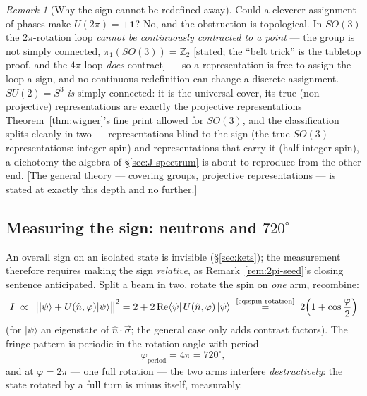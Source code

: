\documentclass[11pt]{article}
\theoremstyle{plain}
\theoremstyle{definition}
\theoremstyle{remark}
\newtheorem{remark}[theorem]{Remark}
\newcommand{\idop}{\mathbf{1}}  %
\newcommand{\ket}[1]{\lvert #1 \rangle}
\newcommand{\bra}[1]{\langle #1 \rvert}
\begin{document}
\begin{remark}[Why the sign cannot be redefined away]
\label{rem:topology}
Could a cleverer assignment of phases make $U(2\pi) = +\idop$? No,
and the obstruction is topological. In $SO(3)$ the $2\pi$-rotation
loop \emph{cannot be continuously contracted to a point} --- the
group is not simply connected, $\pi_1(SO(3)) = \mathbb Z_2$
[stated; the ``belt trick'' is the tabletop proof, and the
$4\pi$ loop \emph{does} contract] --- so a representation is free
to assign the loop a sign, and no continuous redefinition can
change a discrete assignment. $SU(2) = S^3$ \emph{is} simply
connected: it is the universal cover, its true (non-projective)
representations
are exactly the projective representations
Theorem~\ref{thm:wigner}'s fine print allowed for $SO(3)$, and the
classification splits cleanly in two --- representations blind to
the sign (the true $SO(3)$ representations: integer spin) and
representations that carry it (half-integer spin), a dichotomy the
algebra of \S\ref{sec:J-spectrum} is about to reproduce from the
other end. [The general theory --- covering groups, projective
representations --- is stated at exactly this depth and no
further.]
\end{remark}

\subsection{Measuring the sign: neutrons and $720^\circ$}
\label{sec:neutron}

An overall sign on an isolated state is invisible
(\S\ref{sec:kets}); the measurement therefore requires making the
sign \emph{relative}, as Remark~\ref{rem:2pi-seed}'s closing
sentence anticipated. Split a beam in two, rotate the spin on
\emph{one}
arm, recombine:
\begin{equation}
  I \;\propto\;
  \bigl\|\ket\psi + U(\hat n, \varphi)\ket\psi\bigr\|^2
  = 2 + 2\operatorname{Re}
    \bra\psi\,U(\hat n, \varphi)\,\ket\psi
  \;\overset{\text{\eqref{eq:spin-rotation}}}{=}\;
  2\Bigl(1 + \cos\frac\varphi2\Bigr)
  \label{eq:interference-fringe}
\end{equation}
(for $\ket\psi$ an eigenstate of $\hat n\cdot\vec\sigma$; the
general case only adds contrast factors). The fringe pattern is
periodic in the rotation angle with period
\begin{equation}
  \varphi_{\text{period}} = 4\pi = 720^\circ,
\end{equation}
and at $\varphi = 2\pi$ --- one full rotation --- the two arms
interfere \emph{destructively}: the state rotated by a full turn is
minus itself, measurably.
\end{document}
